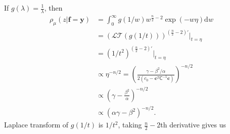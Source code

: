 \documentclass{iitthesis}          %
\newcommand{\bm}[1]{\boldsymbol{#1}}
\newcommand{\D}[1]{\text{d}{#1}}
\newcommand{\vc}{\bm{c}}
\newcommand{\vf}{\bm{f}}
\newcommand{\vy}{\bm{y}}
\newcommand{\mC}{\mathsf{C}}
\begin{document}
If $\displaystyle g(\lambda) = \frac{1}{\lambda}$, then
\begin{align*}
{\rho_{\mu}(z | \vf = \vy)} 
&= \int_{0}^\infty g(1/w)  w^{\frac n2 -2}
\exp \left(  - w \eta \right)
\D w
\\
& = \displaystyle \left(\mathcal{LT}(g(1/t)) \right)^{(\frac n2 -2)'} \lvert_{t=\eta}
\\
& = \left(1/t^{2} \right)^{(\frac n2 -2)'} \lvert_{t=\eta}
\\
& \propto \eta^{-n/2} = \left( \frac{  \gamma - \beta^2/\alpha}{2(c_0  -\vc ^T \mC^{-1} \vc)} \right)^{-n/2}
\\
& \propto \left(\gamma - \frac{\beta^2}{\alpha}\right)^{-n/2}
\\
& \propto \left(\alpha \gamma - \beta^2\right)^{-n/2}.
\end{align*}
Laplace transform of $g(1/t)$ is $1/t^2$, taking $\frac n2 -2$th derivative gives us 
\end{document}
